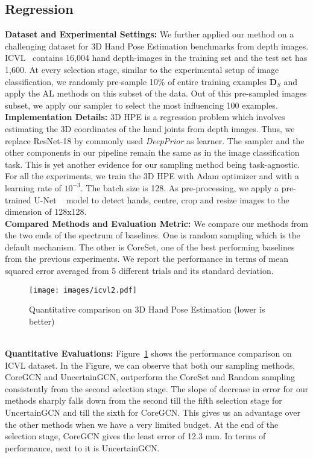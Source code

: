 \subsection{Regression} 
\noindent \textbf{Dataset and Experimental Settings:} We further applied our method on 
a challenging dataset for 3D Hand Pose Estimation benchmarks from depth images. 
ICVL~\cite{icvl} contains 16,004 hand depth-images in the training set and the test set has 1,600. At every selection stage, similar to the experimental setup of image classification, we 
randomly pre-sample 10\% of entire training examples $\mathbf{D}_S$ and apply the AL methods on 
this subset of the data. Out of this pre-sampled images subset, we apply our sampler to select the 
most influencing 100 examples.
\\
\noindent \textbf{Implementation Details:}
3D HPE is a regression problem  which involves estimating the 3D coordinates of the hand joints from depth images.
Thus, we replace ResNet-18 by commonly used \emph{DeepPrior} \cite{deepprior} as learner.
The sampler and the other components in our pipeline remain the same as in 
the image classification task. This is yet another evidence for our
sampling method being task-agnostic. For all the experiments, we train the 3D HPE with
Adam\cite{Kingma2015ADAM:Optimization} optimizer and with a learning rate of $10^{-3}$.
The batch size is 128. As pre-processing, we apply a pre-trained U-Net ~\cite{unet} model to detect hands, 
centre, crop and resize images to the dimension of 128x128.
\\
\noindent \textbf{Compared Methods and Evaluation Metric:}
We compare our methods from the two ends of the spectrum of baselines. One is random sampling 
which is the default mechanism. The other is CoreSet\cite{Sener2017ActiveApproach}, one of the best 
performing baselines from the previous experiments.
We report the performance in terms of mean squared error averaged from 5 different trials 
and its standard deviation. 
\begin{figure}\centering
\texttt{[image: images/icvl2.pdf]}
    \caption{Quantitative comparison on 3D Hand Pose Estimation (lower is better)}\label{fig:hands}\end{figure}
\\
\noindent \textbf{Quantitative Evaluations:} Figure~\ref{fig:hands} shows the performance comparison 
on ICVL dataset. In the Figure, we can observe that both our sampling methods, CoreGCN and UncertainGCN,
outperform the CoreSet and Random sampling consistently from the second selection stage.
The slope of decrease in error for our methods sharply falls down from the second 
till the fifth selection stage for UncertainGCN and till the sixth for CoreGCN. 
This gives us an advantage over the other methods when we have a very limited budget. 
At the end of the selection stage, CoreGCN gives the least error of 12.3 mm. 
In terms of performance, next to it is UncertainGCN. 
